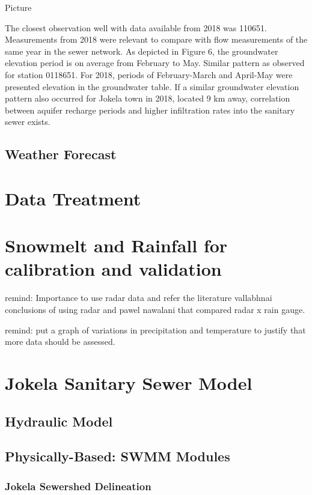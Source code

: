 Picture

The closest observation well with data available from 2018 was 110651. Measurements from 2018 were relevant to compare with flow measurements of the same year in the sewer network. As depicted in Figure 6, the groundwater elevation period is on average from February to May. Similar pattern as observed for station 0118651. For 2018, periods of February-March and April-May were presented elevation in the groundwater table. If a similar groundwater elevation pattern also occurred for Jokela town in 2018, located 9 km away, correlation between aquifer recharge periods and higher infiltration rates into the sanitary sewer exists. 
    
    
    \subsection{Weather Forecast}

\section{Data Treatment}

\section{Snowmelt and Rainfall for calibration and validation}



remind: Importance to use radar data and refer the literature vallabhnai conclusions of using radar and pawel nawalani that compared radar x rain gauge. 

remind: put a graph of variations in precipitation and temperature to justify that more data should be assessed. 


\section{Jokela Sanitary Sewer Model}

    \subsection{Hydraulic Model}
    
    \subsection{Physically-Based: SWMM Modules}


        \subsubsection{Jokela Sewershed Delineation}

